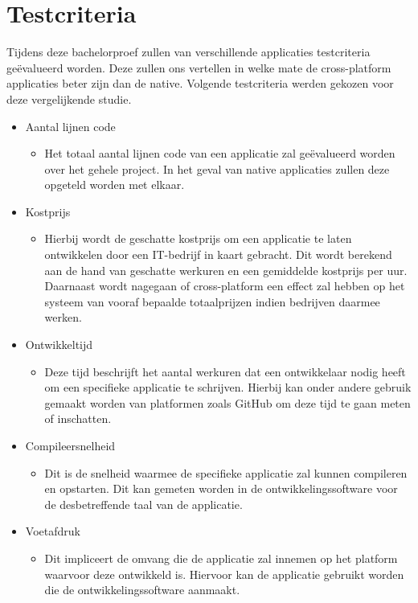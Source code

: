 \section{Testcriteria}
\label{sec:SVZtestcriteria}
Tijdens deze bachelorproef zullen van verschillende applicaties testcriteria geëvalueerd worden. Deze zullen ons vertellen in welke mate de cross-platform applicaties beter zijn dan de native. Volgende testcriteria werden gekozen voor deze vergelijkende studie.
\begin{itemize}
    \item Aantal lijnen code
    \begin{itemize}
        \item Het totaal aantal lijnen code van een applicatie zal geëvalueerd worden over het gehele project. In het geval van native applicaties zullen deze opgeteld worden met elkaar.
    \end{itemize}
    \item Kostprijs
    \begin{itemize}
        \item Hierbij wordt de geschatte kostprijs om een applicatie te laten ontwikkelen door een IT-bedrijf in kaart gebracht. Dit wordt berekend aan de hand van geschatte werkuren en een gemiddelde kostprijs per uur. Daarnaast wordt nagegaan of cross-platform een effect zal hebben op het systeem van vooraf bepaalde totaalprijzen indien bedrijven daarmee werken.
    \end{itemize}
    \item Ontwikkeltijd
    \begin{itemize}
        \item Deze tijd beschrijft het aantal werkuren dat een ontwikkelaar nodig heeft om een specifieke applicatie te schrijven. Hierbij kan onder andere gebruik gemaakt worden van platformen zoals GitHub om deze tijd te gaan meten of inschatten.
    \end{itemize}
    \item Compileersnelheid
    \begin{itemize}
        \item Dit is de snelheid waarmee de specifieke applicatie zal kunnen compileren en opstarten. Dit kan gemeten worden in de ontwikkelingssoftware voor de desbetreffende taal van de applicatie.
    \end{itemize}
    \item Voetafdruk
    \begin{itemize}
        \item Dit impliceert de omvang die de applicatie zal innemen op het platform waarvoor deze ontwikkeld is. Hiervoor kan de applicatie gebruikt worden die de ontwikkelingssoftware aanmaakt.

\end{itemize}
\end{itemize}
